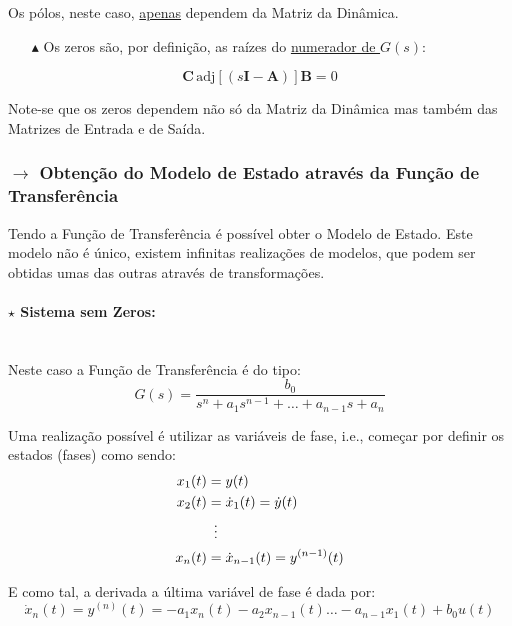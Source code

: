 \noindent Os pólos, neste caso, \underline{apenas} dependem da Matriz da Dinâmica. 

\begin{enumerate}
    \item[$\blacktriangle$] Os zeros são, por definição, as raízes do \underline{numerador de $G(s)$}:
\end{enumerate}
\vspace{-0.5em}
$$
    \pmb{C}\,\text{adj}\left[(s\pmb{I}-\pmb{A}) \right]\pmb{B} = 0
$$

\noindent Note-se que os zeros dependem não só da Matriz da Dinâmica mas também das Matrizes de Entrada e de Saída.
\newpage
\subsubsection[1.1.3 Obtenção do Modelo de Estado através da Função de Transferência]{$\pmb{\rightarrow}$ Obtenção do Modelo de Estado através da Função de Transferência}
\label{subsec:transfer-to-model}

\noindent Tendo a Função de Transferência é possível obter o Modelo de Estado. Este modelo não é único, existem infinitas realizações de modelos, que podem ser obtidas umas das outras através de transformações.

\paragraph[1.1.3 a) Sistema sem Zeros]{$\pmb{\star}$ Sistema sem Zeros:}\mbox{}\\
\noindent Neste caso a Função de Transferência é do tipo:
$$
    G(s) = \frac{b_0}{s^n + a_1 s^{n-1} + \dots + a_{n-1} s + a_n}
$$

\noindent Uma realização possível é utilizar as variáveis de fase, i.e., começar por definir os estados (fases) como sendo:
\vspace{-0.5em}
\begin{align*}
    x_1(t) &= y(t) \\
    x_2(t) &= \dot{x}_1(t) = \dot{y}(t) \\
           &\mkern9mu\vdots \\
    x_n(t) &= \dot{x}_{n-1}(t) = y^{(n-1)}(t)
\end{align*}

\noindent E como tal, a derivada a última variável de fase é dada por:
$$
    \dot{x}_n(t) = y^{(n)}(t) = -a_1 x_n(t) - a_2 x_{n-1}(t) \hdots - a_{n-1} x_1(t) + b_0 u(t)
$$

